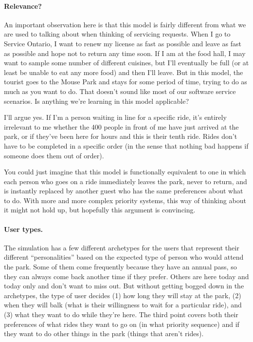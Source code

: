 \documentclass[a4paper]{report}
\begin{document}
\paragraph{Relevance?}
An important observation here is that this model is fairly different from what we are used to talking about when thinking of servicing requests. When I go to Service Ontario, I want to renew my license as fast as possible and leave as fast as possible and hope not to return any time soon. If I am at the food hall, I may want to sample some number of different cuisines, but I'll eventually be full (or at least be unable to eat any more food) and then I'll leave. But in this model, the tourist goes to the Mouse Park and stays for some period of time, trying to do as much as you want to do. That doesn't sound like most of our software service scenarios. Is anything we're learning in this model applicable?

I'll argue yes. If I'm a person waiting in line for a specific ride, it's entirely irrelevant to me whether the 400 people in front of me have just arrived at the park, or if they've been here for hours and this is their tenth ride. Rides don't have to be completed in a specific order (in the sense that nothing bad happens if someone does them out of order).

You could just imagine that this model is functionally equivalent to one in which each person who goes on a ride immediately leaves the park, never to return, and is instantly replaced by another guest who has the same preferences about what to do. With more and more complex priority systems, this way of thinking about it might not hold up, but hopefully this argument is convincing.

\paragraph{User types.}
The simulation has a few different archetypes for the users that represent their different ``personalities'' based on the expected type of person who would attend the park. Some of them come frequently because they have an annual pass, so they can always come back another time if they prefer. Others are here today and today only and don't want to miss out. But without getting bogged down in the archetypes, the type of user decides (1) how long they will stay at the park, (2) when they will balk (what is their willingness to wait for a particular ride), and (3) what they want to do while they're here. The third point covers both their preferences of what rides they want to go on (in what priority sequence)  and if they want to do other things in the park (things that aren't rides).
\end{document}
